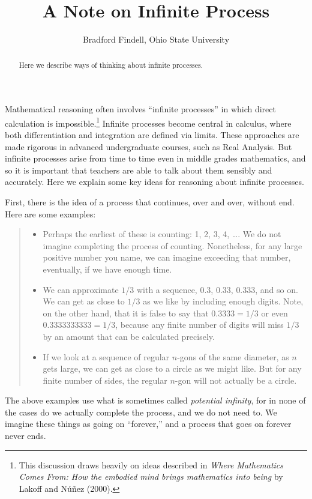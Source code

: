 \documentclass[nooutcomes]{ximera}
\title{A Note on Infinite Process}
\author{Bradford Findell, Ohio State University}
\begin{document}
\begin{abstract}
Here we describe ways of thinking about infinite processes.  
\end{abstract}
\maketitle

Mathematical reasoning often involves ``infinite processes'' in which direct calculation is impossible.\footnote{This discussion draws heavily on ideas described in \emph{Where Mathematics Comes  From: How the embodied mind brings mathematics into being}  by Lakoff and N\'{u}\~{n}ez (2000).}  Infinite processes become central in calculus, where both differentiation and integration are defined via limits.  These approaches are made rigorous in advanced undergraduate courses, such as Real Analysis.  But infinite processes arise from time to time even in middle grades mathematics, and so it is important that teachers are able to talk about them sensibly and accurately.  Here we explain some key ideas for reasoning about infinite processes.  

First, there is the idea of a process that continues, over and over, without end.  
Here are some examples:
\begin{quote}
\begin{itemize}
\item Perhaps the earliest of these is counting: 1, 2, 3, 4, \dots.  We do not imagine completing the process of counting.  Nonetheless, for any large positive number you name, we can imagine exceeding that number, eventually, if we have enough time.  
\item We can approximate $1/3$ with a sequence, $0.3$, $0.33$, $0.333$, and so on.  We can get as close to $1/3$ as we like by including enough digits.  Note, on the other hand, that it is false to say that $0.3333 = 1/3$ or even $0.3333333333 = 1/3$, because any finite number of digits will miss $1/3$ by an amount that can be calculated precisely.  
\item If we look at a sequence of regular $n$-gons of the same diameter, as $n$ gets large, we can get as close to a circle as we might like.  But for any finite number of sides, the regular $n$-gon will not actually be a circle.  
\end{itemize}
\end{quote}

The above examples use what is sometimes called \emph{potential infinity}, for in none of the cases do we actually complete the process, and we do not need to.  We imagine these things as going on ``forever,'' and a process that goes on forever never ends.  
\end{document}
